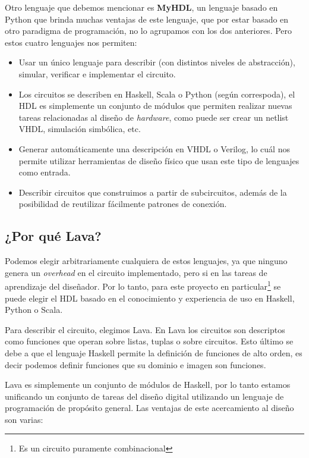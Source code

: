 Otro lenguaje que debemos mencionar es \textbf{MyHDL}\cite{MyHDL}, un lenguaje basado en Python que brinda muchas ventajas de este lenguaje, que por estar basado en otro paradigma de programación, no lo agrupamos con los dos anteriores. Pero estos cuatro lenguajes nos permiten:

\begin{itemize}
\item Usar un único lenguaje para describir (con distintos niveles de abstracción), simular, verificar e implementar el circuito.
\item Los circuitos se describen en Haskell, Scala o Python (según correspoda), el HDL es simplemente un conjunto de módulos que permiten realizar nuevas tareas relacionadas al diseño de \emph{hardware}, como puede ser crear un netlist VHDL, simulación simbólica, etc. 
\item Generar automáticamente una descripción en VHDL o Verilog, lo cuál nos permite utilizar herramientas de diseño físico que usan este tipo de lenguajes como entrada.
\item Describir circuitos que construimos a partir de subcircuitos, además de la posibilidad de reutilizar fácilmente patrones de conexión.
\end{itemize}

\subsection{¿Por qué Lava?}
Podemos elegir arbitrariamente cualquiera de estos lenguajes, ya que ninguno genera un \emph{overhead} en el circuito implementado, pero si en las tareas de aprendizaje del diseñador. Por lo tanto, para este proyecto en particular\footnote{Es un circuito puramente combinacional} se puede elegir el HDL basado en el conocimiento y experiencia de uso en Haskell, Python o Scala.

Para describir el circuito, elegimos Lava. En Lava los circuitos son descriptos como funciones que operan sobre listas, tuplas o sobre circuitos. Esto último se debe a que el lenguaje Haskell permite la definición de funciones de alto orden, es decir podemos definir funciones que su dominio e imagen son funciones. 

Lava es simplemente un conjunto de módulos de Haskell, por lo tanto estamos unificando un conjunto de tareas del diseño digital utilizando un lenguaje de programación de propósito general. Las ventajas de este acercamiento al diseño son varias: 

